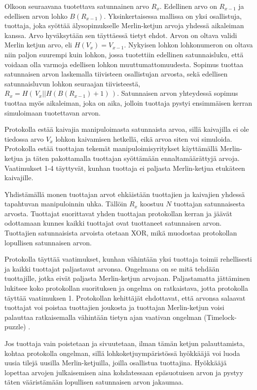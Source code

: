 Olkoon seuraavana tuotettava satunnainen arvo $R_x$. Edellinen arvo on $R_{x-1}$ ja edellisen arvon lohko $B(R_{x-1})$.
Yksinkertaisessa mallissa on yksi osallistuja, tuottaja, joka syöttää älysopimukselle Merlin-ketjun arvoja yhdessä aikaleiman kanssa. Arvo hyväksytään sen täyttäessä tietyt ehdot. Arvon on oltava validi Merlin ketjun arvo, eli $H(V_x) = V_{x-1}$. Nykyisen lohkon lohkonumeron on oltava niin paljon suurempi kuin lohkon, jossa tuotettiin edellinen satunnaisluku, että voidaan olla varmoja edellisen lohkon muuttumattomuudesta. Sopimus tuottaa satunnaisen arvon laskemalla tiivisteen osallistujan arvosta, sekä edellisen satunnaisluvun lohkon seuraajan tiivisteestä, $R_x = H(\, V_x || H(B(R_{x-1})+1) \,)$. Satunnaisen arvon yhteydessä sopimus tuottaa myös aikaleiman, joka on aika, jolloin tuottaja pystyi ensimmäisen kerran simuloimaan tuotettavan arvon. 

Protokolla estää kaivajia manipuloimasta satunnaista arvoa, sillä kaivajilla ei ole tiedossa arvo $V_x$ lohkon kaivamisen hetkellä, eikä arvoa siten voi simuloida. Protokolla estää tuottajan tekemät manipuloimisyritykset käyttämällä Merlin-ketjua ja täten pakottamalla tuottajan syöttämään ennaltamäärättyjä arvoja. Vaatimukset 1-4 täyttyvät, kunhan tuottaja ei paljasta Merlin-ketjua etukäteen kaivajille. 

Yhdistämällä monen tuottajan arvot ehkäistään tuottajien ja kaivajien yhdessä tapahtuvan manipuloinnin uhka. Tällöin $R_x$ koostuu $N$ tuottajan satunnaisesta arvosta. Tuottajat suorittavat yhden tuottajan protokollan kerran ja jäävät odottamaan kunnes kaikki tuottajat ovat tuottaneet satunnaisen arvon. Tuottajien satunnaisista arvoista otetaan XOR, mikä muodostaa protokollan lopullisen satunnaisen arvon.

Protokolla täyttää vaatimukset, kunhan vähintään yksi tuottaja toimii rehellisesti ja kaikki tuottajat paljastavat arvonsa. Ongelmana on se mitä tehdään tuottajille, jotka eivät paljasta Merlin-ketjun arvojaan. Paljastamatta jättäminen lukitsee koko protokollan suorituksen ja ongelma on ratkaistava, jotta protokolla täyttää vaatimuksen 1. Protokollan kehittäjät ehdottavat, että arvonsa salaavat tuottajat voi poistaa tuottajien joukosta ja tuottajan Merlin-ketjun voisi palauttaa ratkaisemalla vähintään tietyn ajan vaativan ongelman (Timelock-puzzle) \cite{MerlinChains}.

Jos tuottaja vain poistetaan ja sivuutetaan, ilman tämän ketjun palauttamista, kohtaa protokolla ongelman, sillä lohkoketjuympäristössä hyökkääjä voi luoda uusia tilejä uusilla Merlin-ketjuilla, joilla osallistua tuottajina. Hyökkääjä lopettaa arvojen julkaisemisen aina kohdatessaan epäsuotuisen arvon ja pystyy täten vääristämään lopullisen satunnaisen arvon jakaumaa. 

